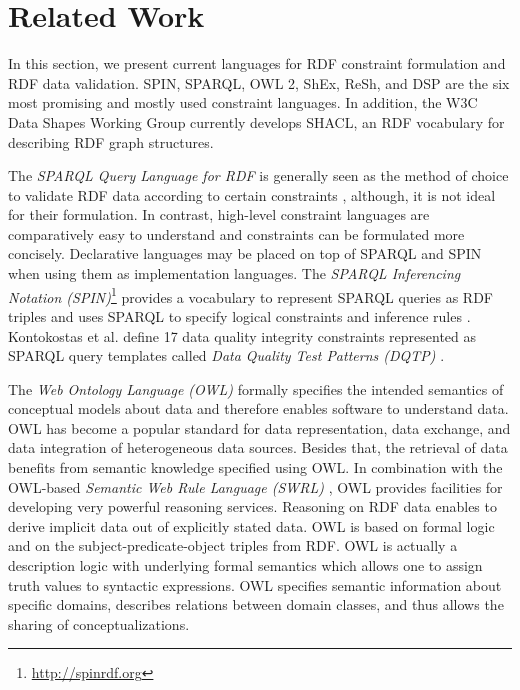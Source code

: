 \documentclass[a4paper,fontsize=11pt]{scrartcl}
\begin{document}
\section{Related Work}

In this section, we present current languages for RDF constraint formulation and RDF data validation. SPIN, SPARQL, OWL 2, ShEx, ReSh, and DSP are the six most promising and mostly used constraint languages. In addition, the W3C Data Shapes Working Group currently develops SHACL, an RDF vocabulary for describing RDF graph structures.

The \emph{SPARQL Query Language for RDF} \cite{W3C-SPARQL1.1-Query-Language-2013} is generally seen as the method of choice to validate RDF data according to certain constraints \cite{Fuerber2010}, 
although, it is not ideal for their formulation. 
In contrast, high-level constraint languages are comparatively easy to understand and constraints can be formulated more concisely.
Declarative languages may be placed on top of SPARQL and SPIN when using them as implementation languages. The \emph{SPARQL Inferencing Notation (SPIN)}\footnote{\url{http://spinrdf.org}} \cite{W3C-SPIN-2011} provides a vocabulary to represent SPARQL queries as RDF triples
and uses SPARQL to specify logical constraints and inference rules \cite{Fuerber2010}. Kontokostas et al. define 17 data quality integrity constraints represented as SPARQL query templates called \emph{Data Quality Test Patterns (DQTP)} \cite{Kontokostas2014}. 

The \emph{Web Ontology Language (OWL)} \cite{W3C-OWL2-Primer-2012} formally specifies the intended semantics of conceptual models about data and therefore enables software to understand data. OWL has become a popular standard for data representation, data exchange, and data integration of heterogeneous data sources. Besides that, the retrieval of data benefits from semantic knowledge specified using OWL. In combination with the OWL-based \emph{Semantic Web Rule Language (SWRL)} \cite{Horrocks04}, OWL provides facilities for developing very powerful reasoning services. Reasoning on RDF data enables to derive implicit data out of explicitly stated data. OWL is based on formal logic and on the subject-predicate-object triples from RDF. OWL is actually a description logic with underlying formal semantics which allows one to assign truth values to syntactic expressions. OWL specifies semantic information about specific domains, describes relations between domain classes, and thus allows the sharing of conceptualizations. 
\end{document}
